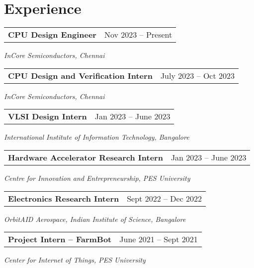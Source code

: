 \section{\sc Experience}

\begin{tabular}{@{}p{4in}p{2in}}
  {\bf{CPU Design Engineer}}  & Nov 2023 – Present \\
\end{tabular}  
\textit{InCore Semiconductors, Chennai} 

\begin{tabular}{@{}p{4in}p{2in}}
  {\bf{CPU Design and Verification Intern}}  & July 2023 – Oct 2023 \\
\end{tabular}  
\textit{InCore Semiconductors, Chennai} 


\begin{tabular}{@{}p{4in}p{2in}}
  {\bf{VLSI Design Intern}} & Jan 2023 – June 2023 \\
\end{tabular}
\textit{International Institute of Information Technology, Bangalore}  


\begin{tabular}{@{}p{4in}p{2in}}
  {\bf{Hardware Accelerator Research Intern}}  & Jan 2023 – June 2023 \\
\end{tabular}
\textit{Centre for Innovation and Entrepreneurship, PES University} 

\begin{tabular}{@{}p{4in}p{2in}}
  {\bf{Electronics Research Intern}} & Sept 2022 – Dec 2022 \\
\end{tabular}
\textit{OrbitAID Aerospace, Indian Institute of Science, Bangalore}  

\begin{tabular}{@{}p{4in}p{2in}}
  {\bf{Project Intern – FarmBot}} & June 2021 – Sept 2021 \\
\end{tabular}
\textit{Center for Internet of Things, PES University}  

\endinput
